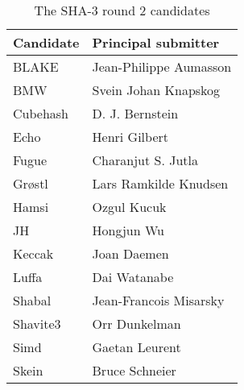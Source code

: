 \begin{table}
  \centering
  \begin{tabular}{ | l | l | }
    \hline
    \textbf{Candidate} & \textbf{Principal submitter}  \\ \hline
     BLAKE       & Jean-Philippe Aumasson   \\ \hline
     \ac{BMW}    & Svein Johan Knapskog     \\ \hline
     Cubehash    & D. J. Bernstein          \\ \hline
     Echo        & Henri Gilbert            \\ \hline
     Fugue       & Charanjut S. Jutla       \\ \hline
     Grøstl      & Lars Ramkilde Knudsen    \\ \hline
     Hamsi       & Ozgul Kucuk              \\ \hline
     JH          & Hongjun  Wu              \\ \hline
     Keccak      & Joan Daemen              \\ \hline
     Luffa       & Dai Watanabe             \\ \hline
     Shabal      & Jean-Francois Misarsky   \\ \hline
     Shavite3    & Orr Dunkelman            \\ \hline
     Simd        & Gaetan Leurent           \\ \hline
     Skein       & Bruce Schneier           \\ \hline
  \end{tabular}
  \caption{The \ac{SHA}-3 round 2 candidates}
  \label{tbl:sha3:candidates}
\end{table}
